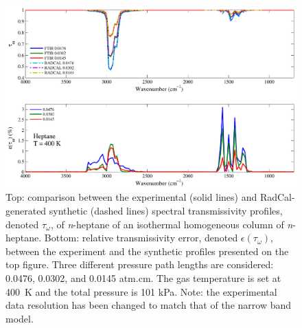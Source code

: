 \begin{figure}[p]
\includegraphics[width=\textwidth]{../Verification/Results_Test2/Heptane_400.pdf}
\caption{Top: comparison between the experimental (solid lines) and RadCal-generated synthetic (dashed lines) spectral transmissivity profiles, denoted $\tau_{\omega}$, of \textit{n}-heptane of an isothermal homogeneous column of \textit{n}-heptane. Bottom: relative transmissivity error, denoted $\epsilon{(\tau_{\omega})}$, between the experiment and the synthetic profiles presented on the top figure. Three different pressure path lengths are considered: 0.0476, 0.0302, and 0.0145 atm.cm. The gas temperature is set at 400~K and the total pressure is 101 kPa. Note: the experimental data resolution has been changed to match that of the narrow band model. \label{fig:nheptane_Verify_400K}}
\end{figure}

